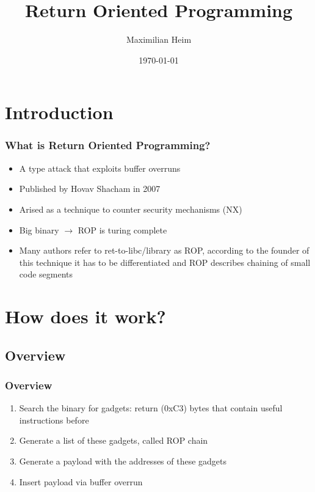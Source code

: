 \documentclass[11pt]{beamer}
\author{Maximilian Heim}
\title{Return Oriented Programming}
\institute{University Albstadt-Sigmaringen}
\date{\today}
\begin{document}
\begin{frame}
\titlepage
\end{frame}

\begin{frame}
\tableofcontents
\end{frame}

\section{Introduction}
\begin{frame}
    \frametitle{What is Return Oriented Programming?}
    \begin{itemize}
    \item A type attack that exploits buffer overruns
    \item Published by Hovav Shacham in 2007
    \item Arised as a technique to counter security mechanisms (NX)
    \item Big binary $\rightarrow$ ROP is turing complete
    \item Many authors refer to ret-to-libc/library as ROP, according to the founder of this technique it has to be differentiated and ROP describes chaining of small code segments
    \end{itemize}
\end{frame}

\section{How does it work?}
\subsection{Overview}
\begin{frame}
    \frametitle{Overview}
    \begin{enumerate}
        \item Search the binary for gadgets: return (0xC3) bytes that contain useful instructions before
        \item Generate a list of these gadgets, called ROP chain
        \item Generate a payload with the addresses of these gadgets
        \item Insert payload via buffer overrun
    \end{enumerate}
\end{frame}
\end{document}
